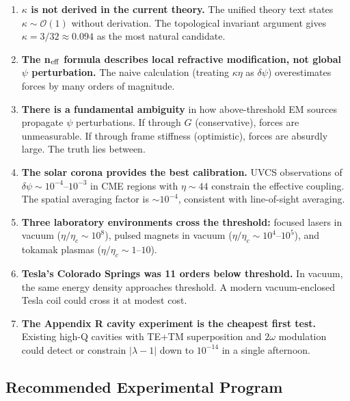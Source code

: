 \documentclass[12pt,a4paper]{article}
\begin{document}
\begin{enumerate}
\item \textbf{$\kappa$ is not derived in the current theory.}
  The unified theory text states $\kappa \sim \mathcal{O}(1)$ without derivation.
  The topological invariant argument gives $\kappa = 3/32 \approx 0.094$ as the
  most natural candidate.

\item \textbf{The n$_{\rm eff}$ formula describes local refractive modification,
  not global $\psi$ perturbation.}  The naive calculation (treating $\kappa\eta$
  as $\delta\psi$) overestimates forces by many orders of magnitude.

\item \textbf{There is a fundamental ambiguity} in how above-threshold EM sources
  propagate $\psi$ perturbations.  If through $G$ (conservative), forces are
  unmeasurable.  If through frame stiffness (optimistic), forces are absurdly
  large.  The truth lies between.

\item \textbf{The solar corona provides the best calibration.}
  UVCS observations of $\delta\psi \sim 10^{-4}$--$10^{-3}$ in CME regions with
  $\eta \sim 44$ constrain the effective coupling.  The spatial averaging
  factor is $\sim 10^{-4}$, consistent with line-of-sight averaging.

\item \textbf{Three laboratory environments cross the threshold:}
  focused lasers in vacuum ($\eta/\eta_c \sim 10^8$), pulsed magnets
  in vacuum ($\eta/\eta_c \sim 10^4$--$10^5$), and tokamak plasmas
  ($\eta/\eta_c \sim 1$--$10$).

\item \textbf{Tesla's Colorado Springs was 11 orders below threshold.}
  In vacuum, the same energy density approaches threshold.  A modern
  vacuum-enclosed Tesla coil could cross it at modest cost.

\item \textbf{The Appendix R cavity experiment is the cheapest first test.}
  Existing high-Q cavities with TE+TM superposition and $2\omega$ modulation
  could detect or constrain $|\lambda - 1|$ down to $10^{-14}$ in a single
  afternoon.
\end{enumerate}

\subsection{Recommended Experimental Program}
\end{document}
